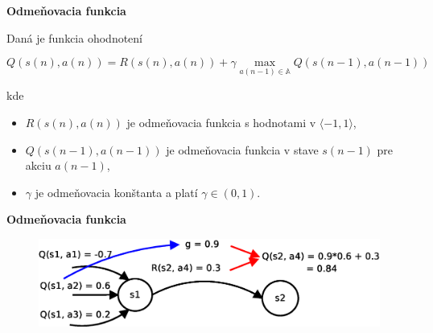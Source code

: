 \documentclass[xcolor=dvipsnames]{beamer}
\begin{document}
\begin{frame}{\bf Odmeňovacia funkcia}

Daná je funkcia ohodnotení

\begin{equation}
Q(s(n),a(n)) = R(s(n),a(n)) + \gamma \max_{a(n-1) \in \mathbb{A}} Q(s(n-1), a(n-1)) \nonumber
\end{equation}

kde \\

\begin{itemize}
 \item $R(s(n),a(n))$ je odmeňovacia funkcia s hodnotami v $\langle -1, 1 \rangle$, \\
 \item $Q(s(n-1),a(n-1))$ je odmeňovacia funkcia v stave $s(n-1)$ pre akciu $a(n-1)$, \\
 \item $\gamma$ je odmeňovacia konštanta a platí $\gamma \in (0, 1)$.
\end{itemize}

\end{frame}


\begin{frame}{\bf Odmeňovacia funkcia}

\begin{figure}[!htb]
\includegraphics[scale=.4]{../diagrams/q_learning_detail.eps}
\end{figure}


\end{frame}
\end{document}
